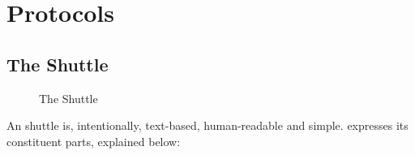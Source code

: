 \chapter{Protocols}
\section{The \rawproto{} Shuttle}
\label{sec:protocol}

\begin{figure}[ht]
	\caption{The \rawproto{} Shuttle} \label{fig:rawproto}
\end{figure}

An \rawprotoacronym{} shuttle is, intentionally, text-based, human-readable
and simple.  expresses its constituent parts,
explained below:

